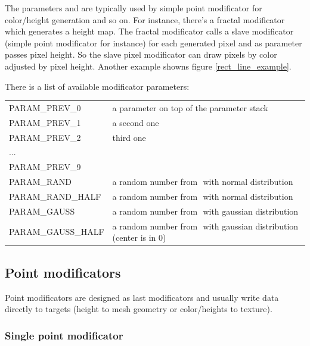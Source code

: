 \documentclass[9pt]{article}
\begin{document}
The parameters and are typically used by simple point modificator 
for color/height generation and so on. For instance, there's a fractal
modificator which generates a height map. The fractal modificator calls
a slave modificator (simple point modificator for instance) for each generated 
pixel and as parameter passes pixel height. So the slave pixel modificator can 
draw pixels by color adjusted by pixel height. Another example showns 
figure \ref{rect_line_example}.

There is a list of available modificator parameters:

\begin{center}
  \begin{tabular}{|l||p{10cm}|}
  \hline
  PARAM\_PREV\_0 & a parameter on top of the parameter stack \\
  PARAM\_PREV\_1 & a second one \\
  PARAM\_PREV\_2 & third one \\
  ... & \\
  PARAM\_PREV\_9 & \\
  PARAM\_RAND & a random number from \begin{math}<-1,1>\end{math} with normal distribution \\
  PARAM\_RAND\_HALF & a random number from \begin{math}<0,1>\end{math} with normal distribution \\
  PARAM\_GAUSS & a random number from \begin{math}<-1,1>\end{math} with gaussian distribution \\
  PARAM\_GAUSS\_HALF & a random number from \begin{math}<0,1>\end{math} with gaussian distribution (center is in 0) \\
  \hline
  \end{tabular}
\end{center}

\newpage
\subsection{Point modificators}

Point modificators are designed as last modificators and usually write
data directly to targets (height to mesh geometry or color/heights to texture). 

\subsubsection{Single point modificator}
\end{document}
